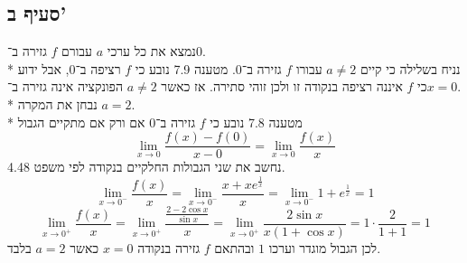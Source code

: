\subsection{סעיף ב'}
נמצא את כל ערכי $a$ עבורם $f$ גזירה ב־$0$. \\*
נניח בשלילה כי קיים $a \ne 2$ עבורו $f$ גזירה ב־$0$. מטענה 7.9 נובע כי $f$ רציפה ב־$0$, אבל ידוע כי $f$ איננה רציפה בנקודה זו ולכן זוהי סתירה.
אז כאשר $a \ne 2$ הפונקציה אינה גזירה ב־$x = 0$. \\*
נבחן את המקרה $a = 2$. \\*
מטענה 7.8 נובע כי $f$ גזירה ב־$0$ אם ורק אם מתקיים הגבול
\[
	\lim_{x \to 0} \frac{f(x) - f(0)}{x - 0}
	= \lim_{x \to 0} \frac{f(x)}{x}
\]
נחשב את שני הגבולות החלקיים בנקודה לפי משפט 4.48.
\[
	\lim_{x \to 0^-} \frac{f(x)}{x}
	= \lim_{x \to 0^-} \frac{x + xe^{\frac{1}{x}}}{x}
	= \lim_{x \to 0^-} 1 + e^{\frac{1}{x}}
	= 1
\]
\[
	\lim_{x \to 0^+} \frac{f(x)}{x}
	= \lim_{x \to 0^+} \frac{\frac{2 - 2 \cos x}{\sin x}}{x}
	= \lim_{x \to 0^+} \frac{2 \sin x}{x(1 + \cos x)}
	= 1 \cdot \frac{2}{1 + 1} = 1
\]
לכן הגבול מוגדר וערכו $1$ ובהתאם $f$ גזירה בנקודה $x = 0$ כאשר $a = 2$ בלבד.

